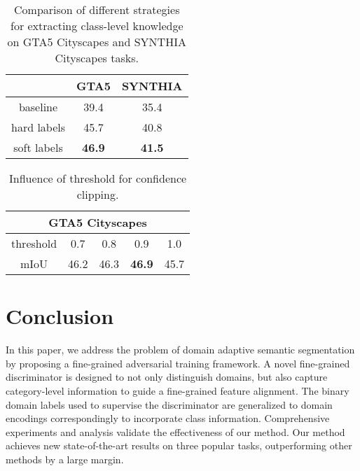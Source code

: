 \documentclass[runningheads]{llncs}
\begin{document}
\begin{table}
    \caption{Comparison of different strategies for extracting class-level knowledge on GTA5  Cityscapes and SYNTHIA  Cityscapes tasks.}
    \centering
    \begin{tabular}{c c c}\hline
     &GTA5&SYNTHIA\\
    \hline
    baseline \cite{Tsai_adaptseg_2018}     &  39.4 & 35.4\\
hard labels & 45.7 & 40.8\\
soft labels   &  \textbf{46.9} & \textbf{41.5}  \\\hline
    \end{tabular}
    \label{tab:hard_vs_soft}
\end{table}



\begin{table}
    \caption{Influence of threshold for confidence clipping.}
    \centering
    \label{tab:confidence_clipping}
    \begin{tabular}{c  c c c c}
    \hline
    \multicolumn{5}{c}{\textbf{GTA5}  \textbf{Cityscapes}}\\
    \hline
    threshold & 0.7  & 0.8  & 0.9  & 1.0 \\
         mIoU & 46.2 & 46.3 & \textbf{46.9} & 45.7  \\
         \hline
    \end{tabular}
    
\end{table}



 
\section{Conclusion}
In this paper, we address the problem of domain adaptive semantic segmentation by proposing a fine-grained adversarial training framework. A novel fine-grained discriminator is designed to not only distinguish domains, but also capture category-level information to guide a fine-grained feature alignment. The binary domain labels used to supervise the discriminator are generalized to domain encodings correspondingly to incorporate class information. 
Comprehensive experiments and analysis validate the effectiveness of our method. Our method achieves new state-of-the-art results on three popular tasks, outperforming other methods by a large margin.
\end{document}
